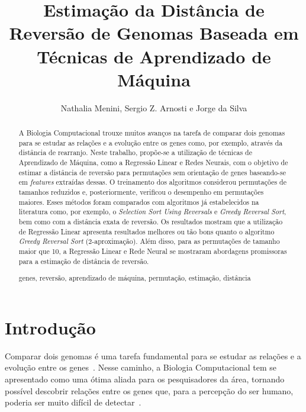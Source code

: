 \documentclass[runningheads,a4paper]{llncs}
\newcommand{\keywords}[1]{\par\addvspace\baselineskip
\noindent\keywordname\enspace\ignorespaces#1}
\begin{document}
\mainmatter

\title{Estimação da Distância de Reversão de Genomas Baseada em Técnicas de Aprendizado de Máquina}


\author{Nathalia Menini, Sergio Z. Arnosti e Jorge da Silva}


\maketitle

\begin{abstract}
A Biologia Computacional trouxe muitos avanços na tarefa de comparar dois genomas para se estudar as relações e a evolução entre os genes como, por exemplo, através da distância de rearranjo.
Neste trabalho, propõe-se a utilização de técnicas de Aprendizado de Máquina, como a Regressão Linear e Redes Neurais, com o objetivo de estimar a distância de reversão para permutações sem orientação de genes baseando-se em \textit{features} extraídas dessas. O treinamento dos algoritmos considerou permutações de tamanhos reduzidos e, posteriormente, verificou o desempenho em permutações maiores. Esses métodos foram comparados com algoritmos já estabelecidos na literatura como, por exemplo, o \textit{Selection Sort Using Reversals} e \textit{Greedy Reversal Sort}, bem como com a distância exata de reversão. Os resultados mostram que a utilização de Regressão Linear apresenta resultados melhores ou tão bons quanto o algoritmo \textit{Greedy Reversal Sort} (2-aproximação). Além disso, para as permutações de tamanho maior que 10, a Regressão Linear e Rede Neural se mostraram abordagens promissoras para a estimação de distância de reversão.
\keywords{genes, reversão, aprendizado de máquina, permutação, estimação, distância}
\end{abstract}

\section{Introdução}
\label{sec:1}

Comparar dois genomas é uma tarefa fundamental para se estudar as relações e a evolução entre os genes~\cite{Lou,daSilva}. Nesse caminho, a Biologia Computacional tem se apresentado como uma ótima aliada para os pesquisadores da área, tornando possível descobrir relações entre os genes que, para a percepção do ser humano, poderia ser muito difícil de detectar~\cite{daSilva}.
\end{document}
